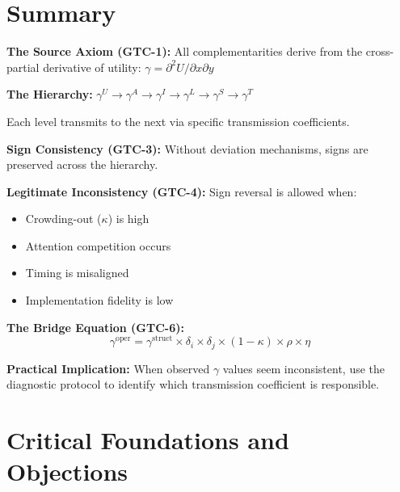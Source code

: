 \section{Summary}
\label{sec:gtc-summary}

\begin{tcolorbox}[colback=blue!5!white, colframe=blue!75!black,
    title=Key Results: General Theory of Complementarity]

\textbf{The Source Axiom (GTC-1):}
All complementarities derive from the cross-partial derivative of utility:
$\gamma = \partial^2 U / \partial x \partial y$

\textbf{The Hierarchy:}
$\gamma^U \to \gamma^A \to \gamma^I \to \gamma^L \to \gamma^S \to \gamma^T$

Each level transmits to the next via specific transmission coefficients.

\textbf{Sign Consistency (GTC-3):}
Without deviation mechanisms, signs are preserved across the hierarchy.

\textbf{Legitimate Inconsistency (GTC-4):}
Sign reversal is allowed when:
\begin{itemize}[nosep]
    \item Crowding-out ($\kappa$) is high
    \item Attention competition occurs
    \item Timing is misaligned
    \item Implementation fidelity is low
\end{itemize}

\textbf{The Bridge Equation (GTC-6):}
\begin{equation}
\gamma^{\text{oper}} = \gamma^{\text{struct}} \times \delta_i \times \delta_j \times (1-\kappa) \times \rho \times \eta
\end{equation}

\textbf{Practical Implication:}
When observed $\gamma$ values seem inconsistent, use the diagnostic protocol
to identify which transmission coefficient is responsible.

\end{tcolorbox}


\section{Critical Foundations and Objections}
\label{sec:gtc-foundations}

